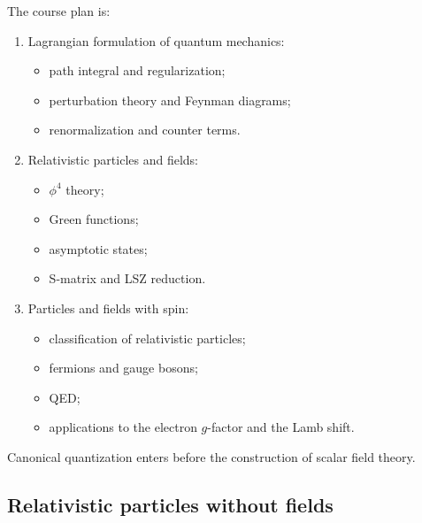 The course plan is:
\begin{enumerate}
  \setlength{\itemsep}{2pt}
  \setlength{\parsep}{0pt}
  \setlength{\parskip}{0pt}
  \item Lagrangian formulation of quantum mechanics:
    \begin{itemize}
      \setlength{\itemsep}{1pt}
      \setlength{\parsep}{0pt}
      \setlength{\topsep}{2pt}
      \item path integral and regularization;
      \item perturbation theory and Feynman diagrams;
      \item renormalization and counter terms.
    \end{itemize}
  \item Relativistic particles and fields:
    \begin{itemize}
      \setlength{\itemsep}{1pt}
      \setlength{\parsep}{0pt}
      \setlength{\topsep}{2pt}
      \item $\phi^4$ theory;
      \item Green functions;
      \item asymptotic states;
      \item S-matrix and LSZ reduction.
    \end{itemize}
  \item Particles and fields with spin:
    \begin{itemize}
      \setlength{\itemsep}{1pt}
      \setlength{\parsep}{0pt}
      \setlength{\topsep}{2pt}
      \item classification of relativistic particles;
      \item fermions and gauge bosons;
      \item QED;
      \item applications to the electron $g$-factor and the Lamb shift.
    \end{itemize}
\end{enumerate}

Canonical quantization enters before the construction of scalar field theory.
\subsection{Relativistic particles without fields}
\label{sec:253a-relativistic-particles}

